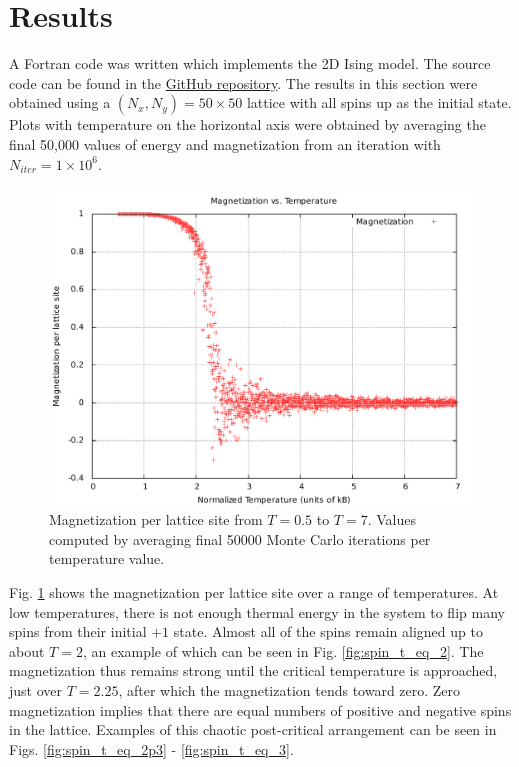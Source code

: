 \documentclass[]{article}
\begin{document}
\section{\label{sec:res}Results}

A Fortran code was written which implements the 2D Ising model. The source code can be found in the \href{https://github.com/hugheyst/ising}{GitHub repository}. The results in this section were obtained using a $(N_x,N_y) = 50 \times 50$ lattice with all spins up as the initial state. Plots with temperature on the horizontal axis were obtained by averaging the final 50,000 values of energy and magnetization from an iteration with $N_{iter} = 1 \times 10^6$.

\begin{figure}[ht!]
 \centering
 \includegraphics[width=\linewidth]{figures/mag_vs_temp.pdf}
 \caption{Magnetization per lattice site from $T=0.5$ to $T=7$. Values computed by averaging final 50000 Monte Carlo iterations per temperature value.}
 \label{fig:mag_vs_temp}
\end{figure}

Fig. \ref{fig:mag_vs_temp} shows the magnetization per lattice site over a range of temperatures. At low temperatures, there is not enough thermal energy in the system to flip many spins from their initial $+1$ state. Almost all of the spins remain aligned up to about $T=2$, an example of which can be seen in Fig. \ref{fig:spin_t_eq_2}. The magnetization thus remains strong until the critical temperature is approached, just over $T=2.25$, after which the magnetization tends toward zero. Zero magnetization implies that there are equal numbers of positive and negative spins in the lattice. Examples of this chaotic post-critical arrangement can be seen in Figs. \ref{fig:spin_t_eq_2p3} - \ref{fig:spin_t_eq_3}.
\end{document}
